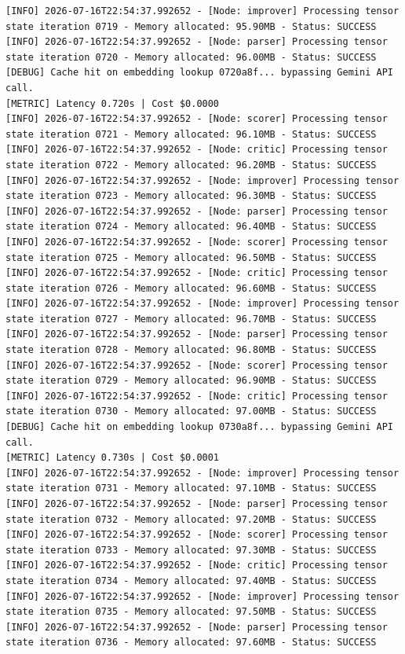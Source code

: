 \documentclass[10pt,journal,compsoc]{IEEEtran}
\begin{document}
\begin{verbatim}
[INFO] 2026-07-16T22:54:37.992652 - [Node: improver] Processing tensor state iteration 0719 - Memory allocated: 95.90MB - Status: SUCCESS
[INFO] 2026-07-16T22:54:37.992652 - [Node: parser] Processing tensor state iteration 0720 - Memory allocated: 96.00MB - Status: SUCCESS
[DEBUG] Cache hit on embedding lookup 0720a8f... bypassing Gemini API call.
[METRIC] Latency 0.720s | Cost $0.0000
[INFO] 2026-07-16T22:54:37.992652 - [Node: scorer] Processing tensor state iteration 0721 - Memory allocated: 96.10MB - Status: SUCCESS
[INFO] 2026-07-16T22:54:37.992652 - [Node: critic] Processing tensor state iteration 0722 - Memory allocated: 96.20MB - Status: SUCCESS
[INFO] 2026-07-16T22:54:37.992652 - [Node: improver] Processing tensor state iteration 0723 - Memory allocated: 96.30MB - Status: SUCCESS
[INFO] 2026-07-16T22:54:37.992652 - [Node: parser] Processing tensor state iteration 0724 - Memory allocated: 96.40MB - Status: SUCCESS
[INFO] 2026-07-16T22:54:37.992652 - [Node: scorer] Processing tensor state iteration 0725 - Memory allocated: 96.50MB - Status: SUCCESS
[INFO] 2026-07-16T22:54:37.992652 - [Node: critic] Processing tensor state iteration 0726 - Memory allocated: 96.60MB - Status: SUCCESS
[INFO] 2026-07-16T22:54:37.992652 - [Node: improver] Processing tensor state iteration 0727 - Memory allocated: 96.70MB - Status: SUCCESS
[INFO] 2026-07-16T22:54:37.992652 - [Node: parser] Processing tensor state iteration 0728 - Memory allocated: 96.80MB - Status: SUCCESS
[INFO] 2026-07-16T22:54:37.992652 - [Node: scorer] Processing tensor state iteration 0729 - Memory allocated: 96.90MB - Status: SUCCESS
[INFO] 2026-07-16T22:54:37.992652 - [Node: critic] Processing tensor state iteration 0730 - Memory allocated: 97.00MB - Status: SUCCESS
[DEBUG] Cache hit on embedding lookup 0730a8f... bypassing Gemini API call.
[METRIC] Latency 0.730s | Cost $0.0001
[INFO] 2026-07-16T22:54:37.992652 - [Node: improver] Processing tensor state iteration 0731 - Memory allocated: 97.10MB - Status: SUCCESS
[INFO] 2026-07-16T22:54:37.992652 - [Node: parser] Processing tensor state iteration 0732 - Memory allocated: 97.20MB - Status: SUCCESS
[INFO] 2026-07-16T22:54:37.992652 - [Node: scorer] Processing tensor state iteration 0733 - Memory allocated: 97.30MB - Status: SUCCESS
[INFO] 2026-07-16T22:54:37.992652 - [Node: critic] Processing tensor state iteration 0734 - Memory allocated: 97.40MB - Status: SUCCESS
[INFO] 2026-07-16T22:54:37.992652 - [Node: improver] Processing tensor state iteration 0735 - Memory allocated: 97.50MB - Status: SUCCESS
[INFO] 2026-07-16T22:54:37.992652 - [Node: parser] Processing tensor state iteration 0736 - Memory allocated: 97.60MB - Status: SUCCESS

\end{verbatim}
\end{document}
